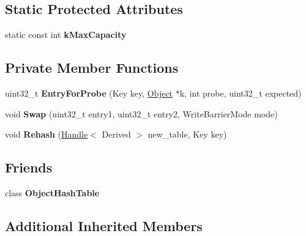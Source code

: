 \subsection*{Static Protected Attributes}
\begin{DoxyCompactItemize}
\item 
static const int {\bfseries k\+Max\+Capacity}
\end{DoxyCompactItemize}
\subsection*{Private Member Functions}
\begin{DoxyCompactItemize}
\item 
uint32\+\_\+t {\bfseries Entry\+For\+Probe} (Key key, \hyperlink{classv8_1_1internal_1_1_object}{Object} $\ast$k, int probe, uint32\+\_\+t expected)\hypertarget{classv8_1_1internal_1_1_hash_table_a9d89762e2a67144529a5c733f21be686}{}\label{classv8_1_1internal_1_1_hash_table_a9d89762e2a67144529a5c733f21be686}

\item 
void {\bfseries Swap} (uint32\+\_\+t entry1, uint32\+\_\+t entry2, Write\+Barrier\+Mode mode)\hypertarget{classv8_1_1internal_1_1_hash_table_a9dd46d34abd4d9dc89c0a1e70d8179ac}{}\label{classv8_1_1internal_1_1_hash_table_a9dd46d34abd4d9dc89c0a1e70d8179ac}

\item 
void {\bfseries Rehash} (\hyperlink{classv8_1_1internal_1_1_handle}{Handle}$<$ Derived $>$ new\+\_\+table, Key key)\hypertarget{classv8_1_1internal_1_1_hash_table_a684f0e7cad9770e97000661512378b4e}{}\label{classv8_1_1internal_1_1_hash_table_a684f0e7cad9770e97000661512378b4e}

\end{DoxyCompactItemize}
\subsection*{Friends}
\begin{DoxyCompactItemize}
\item 
class {\bfseries Object\+Hash\+Table}\hypertarget{classv8_1_1internal_1_1_hash_table_ac26f85b18a3d4e9b953069cc69ab9a9f}{}\label{classv8_1_1internal_1_1_hash_table_ac26f85b18a3d4e9b953069cc69ab9a9f}

\end{DoxyCompactItemize}
\subsection*{Additional Inherited Members}


